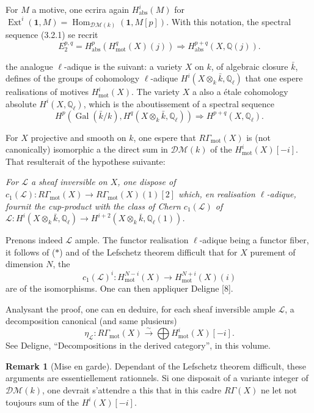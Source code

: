\documentclass[11pt,a4paper]{article}
\theoremstyle{plain}
\theoremstyle{definition}
\newtheorem{remark}[theorem]{Remark}
\DeclareMathOperator{\Ext}{Ext}
\DeclareMathOperator{\Hom}{Hom}
\DeclareMathOperator{\Gal}{Gal}
\newcommand{\Q}{\mathbb{Q}}
\DeclareMathOperator{\mot}{mot}
\newcommand{\abs}{\mathrm{abs}}
\begin{document}
For $M$ a motive, one ecrira again $H^i_{\abs}(M)$ for $\Ext^i(\mathbf{1}, M) = \Hom_{\mathscr{D}\mathcal{M}(k)}(\mathbf{1}, M[p])$. With this notation, the spectral sequence (3.2.1) se recrit
\begin{equation}
\tag{3.2.2}
E_2^{p,q} = H^p_{\abs}(H^q_{\mot}(X)(j)) \Rightarrow H^{p+q}_{\abs}(X, \Q(j)).
\end{equation}

the analogue $\ell$-adique is the suivant: a variety $X$ on $k$, of algebraic closure $\bar{k}$, defines of the groups of cohomology $\ell$-adique $H^i(X \otimes_k \bar{k}, \Q_\ell)$ that one espere realisations of motives $H^i_{\mot}(X)$. The variety $X$ a also a étale cohomology absolute $H^i(X, \Q_\ell)$, which is the aboutissement of a spectral sequence
$$
H^p(\Gal(\bar{k}/k), H^q(X \otimes_k \bar{k}, \Q_\ell)) \Rightarrow H^{p+q}(X, \Q_\ell).
$$

For $X$ projective and smooth on $k$, one espere that $R\Gamma_{\mot}(X)$ is (not canonically) isomorphic a the direct sum in $\mathscr{D}\mathcal{M}(k)$ of the $H^i_{\mot}(X)[-i]$. That resulterait of the hypothese suivante:

\textit{For $\mathscr{L}$ a sheaf inversible on $X$, one dispose of $c_1(\mathscr{L}): R\Gamma_{\mot}(X) \to R\Gamma_{\mot}(X)(1)[2]$ which, en realisation $\ell$-adique, fournit the cup-product with the class of Chern $c_1(\mathscr{L})$ of $\mathscr{L}: H^i(X \otimes_k \bar{k}, \Q_\ell) \to H^{i+2}(X \otimes_k \bar{k}, \Q_\ell(1))$.}

Prenons indeed $\mathscr{L}$ ample. The functor realisation $\ell$-adique being a functor fiber, it follows of ($*$) and of the Lefschetz theorem difficult that for $X$ purement of dimension $N$, the
$$
c_1(\mathscr{L})^i: H^{N-i}_{\mot}(X) \to H^{N+i}_{\mot}(X)(i)
$$
are of the isomorphisms. One can then appliquer Deligne [8].

Analysant the proof, one can en deduire, for each sheaf inversible ample $\mathscr{L}$, a decomposition canonical (and same plusieurs)
$$
\eta_{\mathscr{L}}: R\Gamma_{\mot}(X) \xrightarrow{\sim} \bigoplus H^i_{\mot}(X)[-i].
$$
See Deligne, ``Decompositions in the derived category'', in this volume.

\begin{remark}[Mise en garde]
Dependant of the Lefschetz theorem difficult, these arguments are essentiellement rationnels. Si one disposait of a variante integer of $\mathscr{D}\mathcal{M}(k)$, one devrait s'attendre a this that in this cadre $R\Gamma(X)$ ne let not toujours sum of the $H^i(X)[-i]$.
\end{remark}
\end{document}
